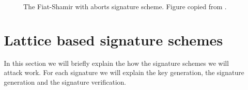 \begin{figure}[h]
\centering
{}
\caption{The Fiat-Shamir with aborts signature scheme. Figure copied from \cite[p.~611]{fiatshamirabort}.}
\label{fig:abortsig}
\end{figure}

\section{Lattice based signature schemes}
In this section we will briefly explain the how the signature schemes we will attack work. For each signature we will explain the key generation, the signature generation and the signature verification.
